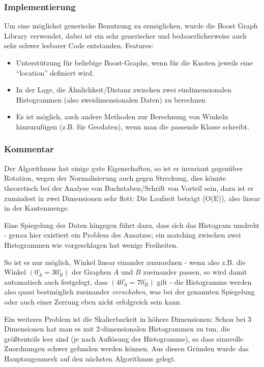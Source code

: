 \documentclass{DEarticle}
\begin{document}
\subsubsection{Implementierung}
Um eine möglichst generische Benutzung zu ermöglichen, wurde die Boost Graph Library \cite{boostgraph} verwendet, dabei
ist ein sehr generischer und bedauerlicherweise auch sehr schwer lesbarer Code entstanden.
Features:
\begin{itemize}
\item Unterstützung für beliebige Boost-Graphs, wenn für die Knoten jeweils eine ``location'' definiert wird.
\item In der Lage, die Ähnlichkeit/Distanz zwischen zwei eindimensionalen Histogrammen (also zweidimensionalen Daten) zu
berechnen
\item Es ist möglich, auch andere Methoden zur Berechnung von Winkeln hinzuzufügen (z.B. für Geodaten), wenn man die
passende Klasse schreibt.
\end{itemize}
\subsubsection{Kommentar}
Der Algorithmus hat einige gute Eigenschaften, so ist er invariant gegenüber Rotation, wegen der Normalisierung auch
gegen Streckung, dies könnte theoretisch bei der Analyse von Buchstaben/Schrift von Vorteil sein, dazu ist er zumindest
in zwei Dimensionen sehr flott: Die Laufzeit beträgt (O(E)), also linear in der Kantenmenge. 

Eine Spiegelung der
Daten hingegen führt dazu, dass sich das Histogram umdreht - genau hier existiert ein Problem des Ansatzes; ein matching
zwischen zwei Histogrammen wie vorgeschlagen hat wenige Freiheiten.

So ist es nur möglich, Winkel linear einander zuzuordnen - wenn also z.B. die Winkel $(0_A^{\circ} = 30_B^{\circ})$ der
Graphen $A$ und $B$ zueinander passen, so wird damit automatisch auch festgelegt, dass $(40_A^{\circ} = 70_B^{\circ})$
gilt - die Histogramme werden also quasi bestmöglich zueinander \emph{verschoben}, was bei der genannten Spiegelung oder
auch einer Zerrung eben nicht erfolgreich sein kann.

Ein weiteres Problem ist die Skalierbarkeit in höhere Dimensionen: Schon bei 3 Dimensionen hat man es mit
2-dimensionalen Histogrammen zu tun, die größtenteils leer sind (je nach Auflösung der Histogramme), so dass sinnvolle
Zuordnungen schwer gefunden werden können.
Aus diesen Gründen wurde das Hauptaugenmerk auf den nächsten Algorithmus gelegt.
\end{document}
